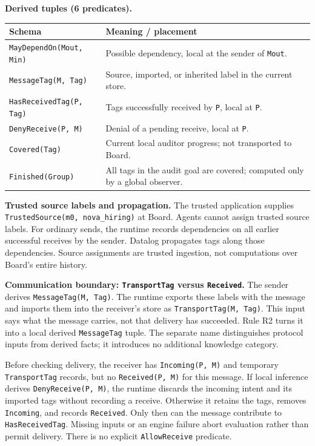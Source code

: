 \documentclass[10pt]{article}
\begin{document}
\textbf{Derived tuples (6 predicates).}
\begin{center}\small
\begin{tabularx}{\linewidth}{@{}l >{\raggedright\arraybackslash}X@{}}
\toprule
\textbf{Schema} & \textbf{Meaning / placement}\\
\midrule
\texttt{MayDependOn(Mout, Min)} & Possible dependency, local at the sender of \texttt{Mout}.\\
\texttt{MessageTag(M, Tag)} & Source, imported, or inherited label in the current store.\\
\texttt{HasReceivedTag(P, Tag)} & Tags successfully received by \texttt{P}, local at \texttt{P}.\\
\texttt{DenyReceive(P, M)} & Denial of a pending receive, local at \texttt{P}.\\
\texttt{Covered(Tag)} & Current local auditor progress; not transported to Board.\\
\texttt{Finished(Group)} & All tags in the audit goal are covered; computed only by a global observer.\\
\bottomrule
\end{tabularx}
\end{center}

\textbf{Trusted source labels and propagation.} The trusted application supplies
\texttt{TrustedSource(m0, nova\_hiring)} at Board. Agents cannot assign trusted source
labels. For ordinary sends, the runtime records dependencies on all earlier successful
receives by the sender. Datalog propagates tags along those dependencies. Source
assignments are trusted ingestion, not computations over Board's entire history.

\textbf{Communication boundary: \texttt{TransportTag} versus \texttt{Received}.}
The sender derives \texttt{MessageTag(M, Tag)}. The runtime exports these labels with
the message and imports them into the receiver's store as \texttt{TransportTag(M, Tag)}.
This input says what the message carries, not that delivery has succeeded. Rule R2
turns it into a local derived \texttt{MessageTag} tuple. The separate name distinguishes
protocol inputs from derived facts; it introduces no additional knowledge category.

Before checking delivery, the receiver has \texttt{Incoming(P, M)} and temporary
\texttt{TransportTag} records, but no \texttt{Received(P, M)} for this message. If local
inference derives \texttt{DenyReceive(P, M)}, the runtime discards the incoming intent
and its imported tags without recording a receive. Otherwise it retains the tags,
removes \texttt{Incoming}, and records \texttt{Received}.
Only then can the message contribute to \texttt{HasReceivedTag}. Missing inputs or an engine
failure abort evaluation rather than permit delivery. There is no explicit
\texttt{AllowReceive} predicate.
\end{document}
